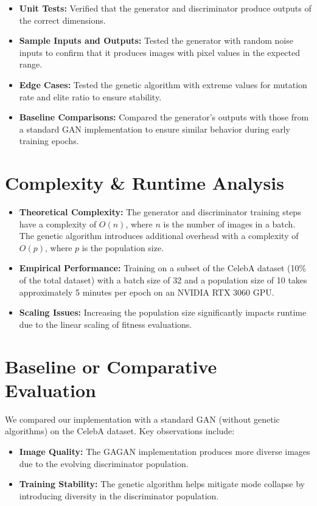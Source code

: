 \documentclass[12pt]{article}
\begin{document}
\begin{itemize}
    \item \textbf{Unit Tests:} Verified that the generator and discriminator produce outputs of the correct dimensions.
    \item \textbf{Sample Inputs and Outputs:} Tested the generator with random noise inputs to confirm that it produces images with pixel values in the expected range.
    \item \textbf{Edge Cases:} Tested the genetic algorithm with extreme values for mutation rate and elite ratio to ensure stability.
    \item \textbf{Baseline Comparisons:} Compared the generator's outputs with those from a standard GAN implementation to ensure similar behavior during early training epochs.
\end{itemize}

\section*{Complexity \& Runtime Analysis}
\begin{itemize}
    \item \textbf{Theoretical Complexity:}  
    The generator and discriminator training steps have a complexity of \(O(n)\), where \(n\) is the number of images in a batch. The genetic algorithm introduces additional overhead with a complexity of \(O(p)\), where \(p\) is the population size.

    \item \textbf{Empirical Performance:}  
    Training on a subset of the CelebA dataset (10\% of the total dataset) with a batch size of 32 and a population size of 10 takes approximately 5 minutes per epoch on an NVIDIA RTX 3060 GPU.

    \item \textbf{Scaling Issues:}  
    Increasing the population size significantly impacts runtime due to the linear scaling of fitness evaluations.
\end{itemize}

\section*{Baseline or Comparative Evaluation}
We compared our implementation with a standard GAN (without genetic algorithms) on the CelebA dataset. Key observations include:

\begin{itemize}
    \item \textbf{Image Quality:} The GAGAN implementation produces more diverse images due to the evolving discriminator population.
    \item \textbf{Training Stability:} The genetic algorithm helps mitigate mode collapse by introducing diversity in the discriminator population.
\end{itemize}
\end{document}
